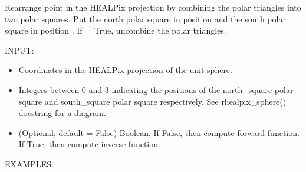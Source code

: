 \documentclass[a4paper,12ptopenany,oneside,english]{sphinxmanual}
\begin{document}
\begin{fulllineitems}
\label{\detokenize{pj_rhealpix:rhealpixdggs.pj_rhealpix.combine_triangles}}
\pysigstartsignatures
{}
\pysigstopsignatures
\sphinxAtStartPar
Rearrange point  in the HEALPix projection by
combining the polar triangles into two polar squares.
Put the north polar square in position  and
the south polar square in position .
If  = True, uncombine the polar triangles.

\sphinxAtStartPar
INPUT:
\begin{itemize}
\item {} 
\sphinxAtStartPar
{} \sphinxhyphen{} Coordinates in the HEALPix projection of the unit sphere.

\item {} 
\sphinxAtStartPar
{} \sphinxhyphen{} Integers between 0 and 3 indicating
the positions of the north\_square polar square and south\_square polar
square respectively.
See rhealpix\_sphere() docstring for a diagram.

\item {} 
\sphinxAtStartPar
{} \sphinxhyphen{} (Optional; default = False) Boolean. If False, then compute
forward function. If True, then compute inverse function.

\end{itemize}

\sphinxAtStartPar
EXAMPLES:


\end{fulllineitems}
\end{document}
